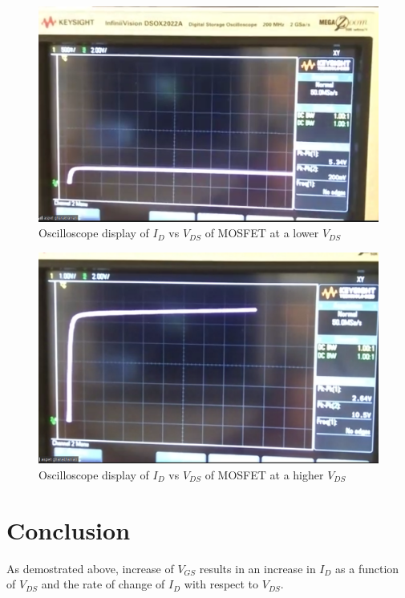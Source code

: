 \documentclass{article}
\begin{document}
\begin{figure}[H]
  \centering
  \includegraphics[width=\textwidth]{ECE2200L_Lab7_scope_1.817.png}
  \caption{Oscilloscope display of $I_D$ vs $V_{DS}$ of MOSFET at a lower $V_{DS}$}
  \label{fig:scope1}
\end{figure}

\begin{figure}[H]
  \centering
  \includegraphics[width=\textwidth]{ECE2200L_Lab7_scope_2.001.png}
  \caption{Oscilloscope display of $I_D$ vs $V_{DS}$ of MOSFET at a higher $V_{DS}$}
  \label{fig:IV2}
\end{figure}


\section*{Conclusion}
As demostrated above, increase of $V_{GS}$ results in an increase in $I_D$ as a function of $V_{DS}$ and the rate of change of $I_D$ with respect to $V_{DS}$.
\end{document}
